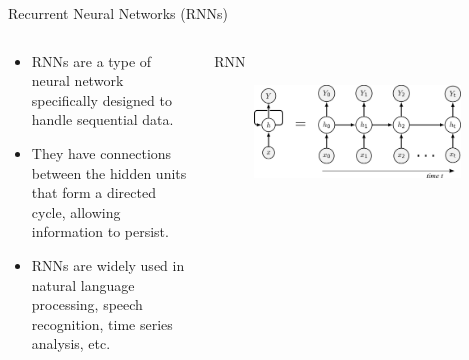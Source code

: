 \documentclass[10pt,aspectratio=169,dvipsnames]{beamer} %
\begin{document}
	\setcounter{subfigure}{0}
	\begin{frame}{Recurrent Neural Networks (RNNs)}
		\begin{columns}[T]
			\begin{column}[c]{0.4\textwidth}
				\justifying
				\begin{itemize}
					\item RNNs are a type of neural network specifically designed to handle sequential data.
					\item They have connections between the hidden units that form a directed cycle, allowing information to persist.
					\item RNNs are widely used in natural language processing, speech recognition, time series analysis, etc.
				\end{itemize}
			\end{column}
			\begin{column}[c]{0.55\textwidth}
				\begin{block}{RNN}
					\begin{figure}
						\includegraphics[width=0.95\textwidth]{unrolled_rnn.png}
					\end{figure}
				\end{block}				
			\end{column}
		\end{columns}
	\end{frame}
\end{document}
